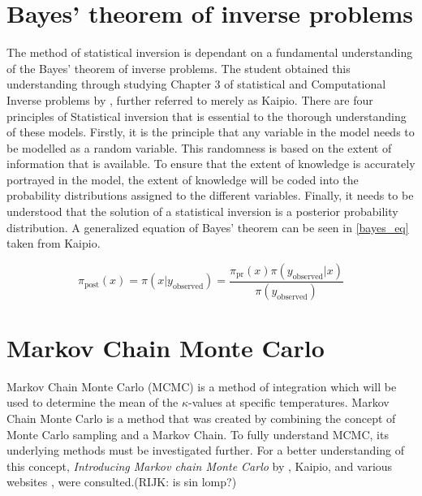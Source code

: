 \section{Bayes' theorem of inverse problems}
	The method of statistical inversion is dependant on a fundamental understanding of the Bayes' theorem of inverse problems. 
	The student obtained this understanding through studying Chapter 3 of statistical and Computational Inverse problems by \citet{Kaipo:2005}, further referred to merely as Kaipio. 
	There are four principles of Statistical inversion that is essential to the thorough understanding of these models. 
	Firstly, it is the principle that any variable in the model needs to be modelled as a random variable. 
	This randomness is based on the extent of information that is available. 
	To ensure that the extent of knowledge is accurately portrayed in the model, the extent of knowledge will be coded into the probability distributions assigned to the different variables. 
	Finally, it needs to be understood that the solution of a statistical inversion is a posterior probability distribution.
	A generalized equation of Bayes' theorem can be seen in \ref{bayes_eq} taken from Kaipio. 
	
	\begin{equation}
	\label{bayes_eq}
	\pi_{\text{post}}(x) = \pi(x|y_{\text{observed}}) = \frac{\pi_{\text{pr}}(x) \pi(y_{\text{observed}}|x)}{\pi (y_{\text{observed}})}	
	\end{equation}

\section{Markov Chain Monte Carlo} \label{MCMCdet}
Markov Chain Monte Carlo (MCMC) is a method of integration which will be used to determine the mean of the $\kappa$-values at specific temperatures. 
	Markov Chain Monte Carlo is a method that was created by combining the concept of Monte Carlo sampling  and a Markov Chain. 
	To fully understand MCMC, its underlying methods must be investigated further.
	For a better understanding of this concept, \textit{Introducing Markov chain Monte Carlo} by \citeauthor{Gilks:1996}, Kaipio, and various websites \cite{MLM:2019}, \cite{dummies:2015} were consulted.(RIJK: is sin lomp?)
